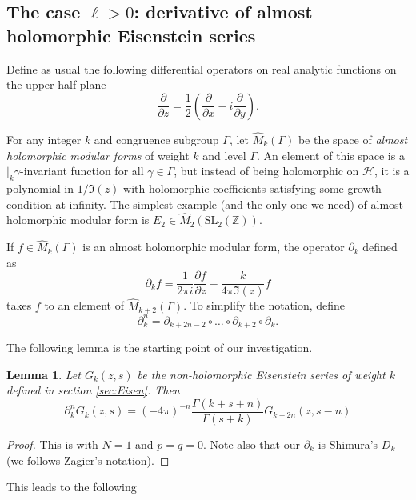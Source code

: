 \documentclass[twoside,10pt]{article}
\newtheorem{lemma}{Lemma}
\newcommand{\dashk}{\vert_{k}}
\renewcommand{\H}{\mathcal{H}}
\newcommand{\SL}{\textrm{SL}_2(\mathbb{Z})}
\newcommand{\del}{\partial}
\begin{document}
\subsection{The case $\ell>0$: derivative of almost holomorphic Eisenstein series}\label{sec:caselgeq1}
Define as usual the following differential operators on real analytic functions on the upper half-plane
\[\frac{\del}{\del z}=\frac{1}{2}\left (\frac{\del}{\del x}-i\frac{\del }{\del y}\right ).\]

For any integer $k$ and congruence subgroup $\Gamma$, let $\hat{M}_k(\Gamma)$ be the space of \emph{almost holomorphic modular forms} of weight $k$ and level $\Gamma$. An element of this space is a $\dashk\gamma$-invariant function for all $\gamma\in\Gamma$, but instead of being holomorphic on $\H$, it is a polynomial in $1/\Im(z)$ with holomorphic coefficients satisfying some growth condition at infinity. The simplest example (and the only one we need) of almost holomorphic modular form is $E_2\in\hat{M}_2(\SL)$.

If $f\in \hat{M}_k(\Gamma)$ is an almost holomorphic modular form, the operator $\del_k$ defined as
\[\del_k f=\frac{1}{2\pi i}\frac{\del f}{\del z}-\frac{k}{4\pi\Im(z)}f\]
takes $f$ to an element of $\hat{M}_{k+2}(\Gamma)$. To simplify the notation, define
\[\del_k^n=\del_{k+2n-2}\circ\dots\circ\del_{k+2}\circ\del_k.\]

The following lemma is the starting point of our investigation.

\begin{lemma}
	Let $G_k(z,s)$ be the non-holomorphic Eisenstein series of weight $k$ defined in section \ref{sec:Eisen}. Then
	\[\del_k^nG_k(z,s)=(-4\pi)^{-n}\frac{\Gamma(k+s+n)}{\Gamma(s+k)}G_{k+2n}(z,s-n)\]
\end{lemma}
\begin{proof}
	This is \cite[Formula 9.12]{Shi1} with $N=1$ and $p=q=0$. Note also that our $\del_k$ is Shimura's $D_k$ (we follows Zagier's notation).
\end{proof}

This leads to the following
\end{document}
